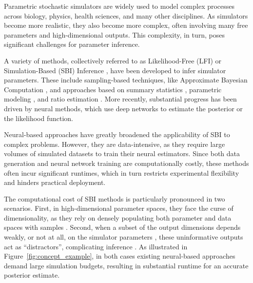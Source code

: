 \documentclass[twoside]{article}
\begin{document}
Parametric stochastic simulators are widely used to model complex processes across biology, physics, health sciences, and many other disciplines.
As simulators become more realistic, they also become more complex, often involving many free parameters and high-dimensional outputs.
This complexity, in turn, poses significant challenges for parameter inference.

A variety of methods, collectively referred to as Likelihood-Free (LFI) or Simulation-Based (SBI) Inference \citep{lintusaari2017fundamentals, sisson2018handbook, cranmer2020frontier, deistler2025simulation}, have been developed to infer simulator parameters.
These include sampling-based techniques, like Approximate Bayesian Computation \citep[ABC,][]{Marin2012}, and approaches based on summary statistics \citep{Chen2021a, Chen2023}, parametric modeling \citep{wood2010statistical, price2018bayesian}, and ratio estimation \citep{thomas2022likelihood, durkan2020contrastive}.
More recently, substantial progress has been driven by neural methods, which use deep networks to estimate the posterior \citep{greenberg2019automatic, papamakarios2016fast, radev2020bayesflow, wildberger2023flow} or the likelihood \citep{papamakarios2019sequential} function.

Neural-based approaches have greatly broadened the applicability of SBI to complex problems.
However, they are data-intensive, as they require large volumes of simulated datasets to train their neural estimators.
Since both data generation%
and neural network training are computationally costly, these methods often incur significant runtimes, which in turn restricts experimental flexibility and hinders practical deployment.

The computational cost of SBI methods is particularly pronounced in two scenarios.
First, in high-dimensional parameter spaces, they face the curse of dimensionality, as they rely on densely populating both parameter and data spaces with samples \citep{lintusaari2017fundamentals, sisson2018handbook}.
Second, when a subset of the output dimensions depends weakly, or not at all, on the simulator parameters \citep{Saltelli2008, MonsalveBravo2022}, these uninformative outputs act as ``distractors'', complicating inference \citep{lueckmann2021benchmarking}.
As illustrated in Figure~\ref{fig:concept_example}, in both cases existing neural-based approaches demand large simulation budgets, resulting in substantial runtime for an accurate posterior estimate.
\end{document}

